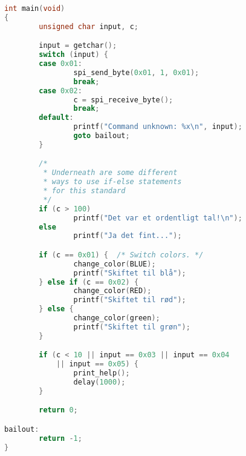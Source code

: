 \documentclass[article, 10pt]{memoir}
\begin{document}
\begin{landscape}
\begin{multicols}{2}
\begin{lstlisting}[language=c]
int main(void)
{
        unsigned char input, c;

        input = getchar();
        switch (input) {
        case 0x01:
                spi_send_byte(0x01, 1, 0x01);
                break;
        case 0x02:
                c = spi_receive_byte();
                break;
        default:
                printf("Command unknown: %x\n", input);
                goto bailout;
        }

        /* 
         * Underneath are some different 
         * ways to use if-else statements
         * for this standard 
         */
        if (c > 100)
                printf("Det var et ordentligt tal!\n");
        else
                printf("Ja det fint...");

        if (c == 0x01) {  /* Switch colors. */
                change_color(BLUE);
                printf("Skiftet til blå");
        } else if (c == 0x02) {
                change_color(RED);
                printf("Skiftet til rød");
        } else {
                change_color(green);
                printf("Skiftet til grøn");
        }

        if (c < 10 || input == 0x03 || input == 0x04
            || input == 0x05) {
                print_help();
                delay(1000);
        }

        return 0;

bailout:
        return -1;
}
        \end{lstlisting}
    \end{multicols}
\end{landscape}
\end{document}
